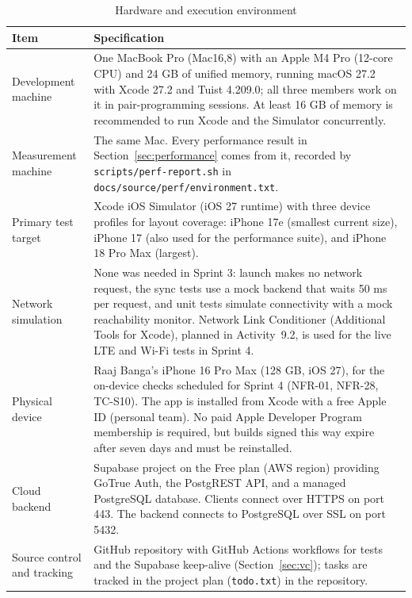 \documentclass[12pt,letterpaper]{article}
\begin{document}
\begin{table}[H]
\centering
\caption{Hardware and execution environment}
\label{tab:hardware}
\begin{tabularx}{\textwidth}{@{}L{3.3cm} Y@{}}
\toprule
\textbf{Item} & \textbf{Specification} \\
\midrule
Development machine & One MacBook Pro (Mac16,8) with an Apple M4 Pro (12-core CPU) and 24 GB of unified memory, running macOS 27.2 with Xcode 27.2 and Tuist 4.209.0; all three members work on it in pair-programming sessions. At least 16 GB of memory is recommended to run Xcode and the Simulator concurrently. \\
Measurement machine & The same Mac. Every performance result in Section~\ref{sec:performance} comes from it, recorded by \texttt{scripts/perf-report.sh} in \texttt{docs/source/perf/environment.txt}. \\
Primary test target & Xcode iOS Simulator (iOS 27 runtime) with three device profiles for layout coverage: iPhone 17e (smallest current size), iPhone 17 (also used for the performance suite), and iPhone 18 Pro Max (largest). \\
Network simulation & None was needed in Sprint 3: launch makes no network request, the sync tests use a mock backend that waits 50 ms per request, and unit tests simulate connectivity with a mock reachability monitor. Network Link Conditioner (Additional Tools for Xcode), planned in Activity~9.2, is used for the live LTE and Wi-Fi tests in Sprint 4. \\
Physical device & Raaj Banga's iPhone 16 Pro Max (128 GB, iOS 27), for the on-device checks scheduled for Sprint 4 (NFR-01, NFR-28, TC-S10). The app is installed from Xcode with a free Apple ID (personal team). No paid Apple Developer Program membership is required, but builds signed this way expire after seven days and must be reinstalled. \\
Cloud backend & Supabase project on the Free plan (AWS region) providing GoTrue Auth, the PostgREST API, and a managed PostgreSQL database. Clients connect over HTTPS on port 443. The backend connects to PostgreSQL over SSL on port 5432. \\
Source control and tracking & GitHub repository with GitHub Actions workflows for tests and the Supabase keep-alive (Section~\ref{sec:vc}); tasks are tracked in the project plan (\texttt{todo.txt}) in the repository. \\
\bottomrule
\end{tabularx}
\end{table}
\end{document}
